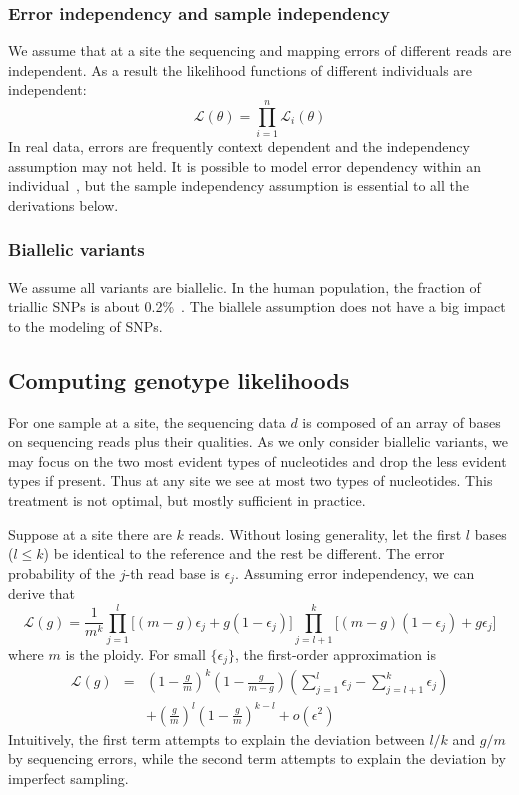 \documentclass{bioinfo}
\begin{document}
\begin{methods}
\subsubsection{Error independency and sample independency}
We assume that at a site the sequencing and mapping errors of different reads
are independent. As a result the likelihood functions of
different individuals are independent:
\begin{equation}
\mathcal{L}(\theta)=\prod_{i=1}^n\mathcal{L}_i(\theta)
\end{equation}
In real data, errors are frequently context dependent and the independency assumption
may not held. It is possible to model error dependency within an individual~\citep{Li:2008zr},
but the sample independency assumption is essential to all the derivations below.

\subsubsection{Biallelic variants}
We assume all variants are biallelic. In the human population, the fraction
of triallic SNPs is about 0.2\%~\citep{Hodgkinson:2010uq}. The biallele assumption
does not have a big impact to the modeling of SNPs.

\subsection{Computing genotype likelihoods}

For one sample at a site, the sequencing data $d$ is composed of
an array of bases on sequencing reads plus their qualities. As
we only consider biallelic variants, we may focus on the two most
evident types of nucleotides and drop the less evident types if present. Thus
at any site we see at most two types of nucleotides. This treatment
is not optimal, but mostly sufficient in practice.

Suppose at a site there are $k$ reads. Without losing generality, let the first $l$
bases ($l\le k$) be identical to the reference and the rest be
different. The error probability of the $j$-th read base is $\epsilon_j$.
Assuming error independency, we can derive that
\begin{equation}\label{equ:glk}
\mathcal{L}(g)=\frac{1}{m^k}\prod_{j=1}^l\Big[(m-g)\epsilon_j+g(1-\epsilon_j)\Big]\prod_{j=l+1}^k\Big[(m-g)(1-\epsilon_j)+g\epsilon_j\Big]
\end{equation}
where $m$ is the ploidy. For small $\{\epsilon_j\}$, the first-order approximation is
\begin{eqnarray*}
\mathcal{L}(g)&=&\left(1-\frac{g}{m}\right)^k\left(1-\frac{g}{m-g}\right)\left(\sum_{j=1}^l\epsilon_j-\sum_{j=l+1}^k\epsilon_j\right)\\
&&+\left(\frac{g}{m}\right)^l\left(1-\frac{g}{m}\right)^{k-l}+o(\epsilon^2)
\end{eqnarray*}
Intuitively, the first term attempts to explain
the deviation between $l/k$ and $g/m$ by sequencing errors, while
the second term attempts to explain the deviation by imperfect sampling.


\end{methods}
\end{document}
